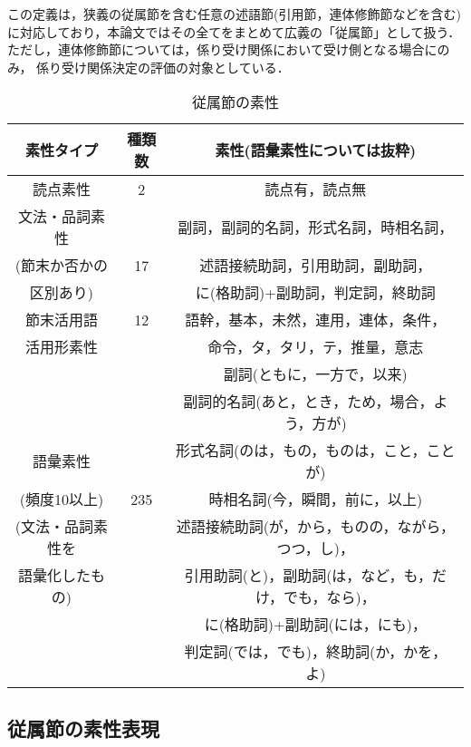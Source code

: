 この定義は，狭義の従属節を含む任意の述語節(引用節，連体修飾節などを含む)
に対応しており，本論文ではその全てをまとめて広義の「従属節」として扱う．
ただし，連体修飾節については，係り受け関係において受け側となる場合にのみ，
係り受け関係決定の評価の対象としている．

\begin{table*}
\begin{center}
\caption{従属節の素性}
\label{tab:ftr}
\begin{tabular}[c]{|c|c|c|} \hline
\multicolumn{1}{|c|}{素性タイプ} & 種類数 & \multicolumn{1}{|c|}{素性(語彙素性については抜粋)} \\ \hline\hline
読点素性  & 2 & 読点有，読点無 \\ \hline
文法・品詞素性 &  & 副詞，副詞的名詞，形式名詞，時相名詞，\\
(節末か否かの & 17 & 述語接続助詞，引用助詞，副助詞，\\
区別あり) & & に(格助詞)+副助詞，判定詞，終助詞 \\ \hline
節末活用語 & 12 & 語幹，基本，未然，連用，連体，条件，
                \\ 
活用形素性 &  & 命令，タ，タリ，テ，推量，意志 
                \\ \hline
        & & 副詞(ともに，一方で，以来)\\
        & & 副詞的名詞(あと，とき，ため，場合，よう，方が) \\
語彙素性    & & 形式名詞(のは，もの，ものは，こと，ことが)\\
(頻度10以上)	      & 235 & 時相名詞(今，瞬間，前に，以上) \\
(文法・品詞素性を         & & 述語接続助詞(が，から，ものの，ながら，つつ，し)，\\
語彙化したもの)         & & 引用助詞(と)，副助詞(は，など，も，だけ，でも，なら)，\\
        & & に(格助詞)+副助詞(には，にも)，\\
	& & 判定詞(では，でも)，終助詞(か，かを，よ) \\ \hline
\end{tabular}
\end{center}
\end{table*}
\vspace{-2mm}
\subsection{従属節の素性表現}
\label{subsec:ftr}

